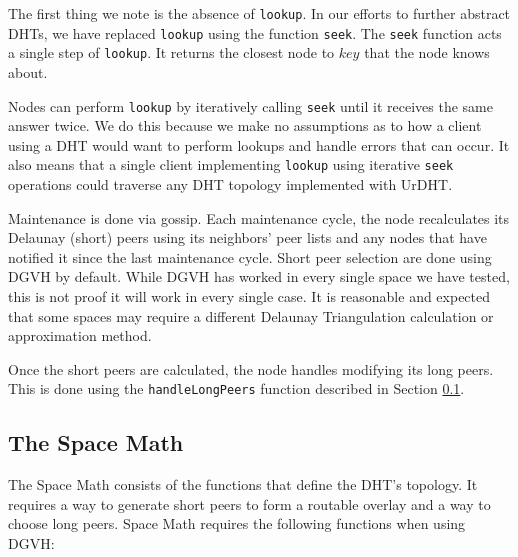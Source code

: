 The first thing we note is the absence of \texttt{lookup}.
In our efforts to further abstract DHTs, we have replaced \texttt{lookup} using the function \texttt{seek}.
The \texttt{seek} function acts a single step of \texttt{lookup}.
It returns the closest node to $ key $ that the node knows about.

Nodes can perform \texttt{lookup} by iteratively calling \texttt{seek} until it receives the same answer twice.
We do this because we make no assumptions as to how a client using a DHT would want to perform lookups and handle errors that can occur.
It also means that a single client implementing \texttt{lookup} using iterative \texttt{seek} operations could traverse any DHT topology implemented with UrDHT.

%
%
%


Maintenance is done via gossip.
Each maintenance cycle, the node recalculates its Delaunay (short) peers using its neighbors' peer lists and any nodes that have notified it since the last maintenance cycle.
Short peer selection are done using DGVH by default.
While DGVH has worked in every single space we have tested, this is not proof it will work in every single case.
It is reasonable and expected that some spaces may require a different Delaunay Triangulation calculation or approximation method.

Once the short peers are calculated, the node handles modifying its long peers.
This is done using the \texttt{handleLongPeers} function described in Section \ref{sec:space}.

\subsection{The Space Math}
\label{sec:space}
The Space Math consists of the functions that define the DHT's topology.
It requires a way to generate short peers to form a routable overlay and a way to choose long peers.
Space Math requires the following functions when using DGVH:

